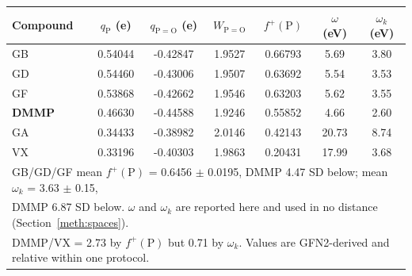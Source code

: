 \begin{tabular}{lcccccc}
\hline
Compound & $q_{\mathrm{P}}$ (e) & $q_{\mathrm{P=O}}$ (e) & $W_{\mathrm{P=O}}$ &
$f^{+}(\mathrm{P})$ & $\omega$ (eV) & $\omega_k$ (eV) \\
\hline
GB & 0.54044 & -0.42847 & 1.9527 & 0.66793 & 5.69 & 3.80 \\
GD & 0.54460 & -0.43006 & 1.9507 & 0.63692 & 5.54 & 3.53 \\
GF & 0.53868 & -0.42662 & 1.9546 & 0.63203 & 5.62 & 3.55 \\
\textbf{DMMP} & 0.46630 & -0.44588 & 1.9246 & 0.55852 & 4.66 & 2.60 \\
GA & 0.34433 & -0.38982 & 2.0146 & 0.42143 & 20.73 & 8.74 \\
VX & 0.33196 & -0.40303 & 1.9863 & 0.20431 & 17.99 & 3.68 \\
\hline
\multicolumn{7}{l}{\footnotesize GB/GD/GF mean $f^{+}(\mathrm{P})$ = 0.6456
$\pm$ 0.0195, DMMP 4.47 SD below; mean $\omega_k$ = 3.63 $\pm$ 0.15,}\\
\multicolumn{7}{l}{\footnotesize DMMP 6.87 SD below. $\omega$ and $\omega_k$ are
reported here and used in no distance (Section~\ref{meth:spaces}).}\\
\multicolumn{7}{l}{\footnotesize DMMP/VX = 2.73 by $f^{+}(\mathrm{P})$ but 0.71 by
$\omega_k$. Values are GFN2-derived and relative within one protocol.}\\
\end{tabular}
